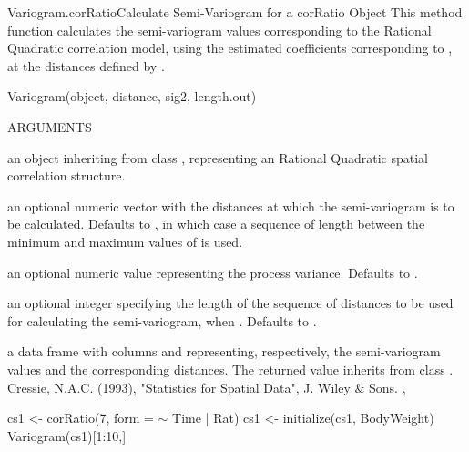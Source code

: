 \documentclass[pdftex]{article} \usepackage{url,graphicx}
\renewcommand{\Twiddle}{\mbox{\(\sim\)}}
\begin{document}
\begin{Helpfile}{Variogram.corRatio}{Calculate Semi-Variogram for a
    corRatio Object} 
  This method function calculates the semi-variogram values
  corresponding to the Rational Quadratic correlation model, using the
  estimated coefficients corresponding to , at the
  distances defined by .
\begin{Example}
Variogram(object, distance, sig2, length.out)
\end{Example}
\begin{Argument}{ARGUMENTS}
\item[\Co{object:}]
an object inheriting from class ,
representing an Rational Quadratic spatial correlation structure.
\item[\Co{distance:}]
an optional numeric vector with the distances at
which the semi-variogram is to be calculated. Defaults to
, in which case a sequence of length 
between the minimum and maximum values of
 is used.
\item[\Co{sig2:}]
an optional numeric value representing the process
variance. Defaults to .
\item[\Co{length.out:}]
an optional integer specifying the length of the
sequence of distances to be used for calculating the semi-variogram,
when . Defaults to .
\end{Argument}
a data frame with columns  and  representing,
respectively, the semi-variogram values and the corresponding
distances. The returned value inherits from class .
Cressie, N.A.C. (1993), "Statistics for Spatial Data", J. Wiley \& Sons.
, 
\need 15pt
\vspace{-16pt}
\begin{Example}
cs1 <- corRatio(7, form = {\Twiddle} Time | Rat)
cs1 <- initialize(cs1, BodyWeight)
Variogram(cs1)[1:10,]
\end{Example}
\end{Helpfile}
\end{document}
